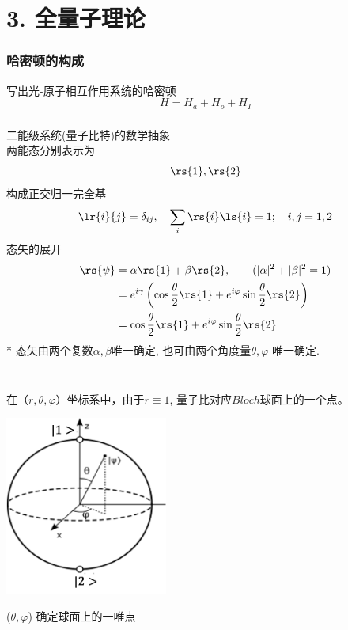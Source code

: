 \section{3. 全量子理论}

\begin{frame} 
\frametitle{哈密顿的构成}
     写出光-原子相互作用系统的哈密顿
     \[ H= H_a + H_o + H_{I}\]
\end{frame}

\begin{frame} 
\frametitle{}
    {\Bullet} 二能级系统(量子比特)的数学抽象 \\ 
    两能态分别表示为
    \[\rs{1}, \rs{2}\]
    构成正交归一完全基
    \[ \lr{i}{j}= \delta_{ij}, \quad \sum_i \rs{i} \ls{i} =1 ; \quad i,j=1,2\]
    态矢的展开
    \[\begin{aligned}
        \rs{\psi} &=\alpha\rs{1}+\beta\rs{2}, \qquad (|\alpha|^2+|\beta|^2=1)\\ 
        &=e^{i\gamma} \left(\cos\frac{\theta}{2}\rs{1}+e^{i\varphi} \sin\frac{\theta}{2}\rs{2}\right) \\
        &=\cos\frac{\theta}{2}\rs{1}+e^{i\varphi} \sin\frac{\theta}{2}\rs{2}
      \end{aligned}\]
    * 态矢由两个复数$\alpha,\beta$唯一确定, 也可由两个角度量$\theta, \varphi$ 唯一确定.
\end{frame}

\begin{frame} 
    \frametitle{} 
    ~\\
  在（$r,\theta,\varphi$）坐标系中，由于$r\equiv 1$, 量子比对应$Bloch$球面上的一个点。
  \begin{center}
    \includegraphics[width=0.4\textwidth]{figs/240.png}
\end{center} 
($\theta, \varphi$) 确定球面上的一唯点
\end{frame}


